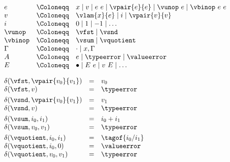 \begin{flushleft}

$\begin{array}{l c l}
  e & \Coloneqq & x \mid v \mid e~e \mid \vpair{e}{e} \mid \vunop~e \mid \vbinop~e~e
\\
  v & \Coloneqq & \vlam{x}{e} \mid i \mid \vpair{v}{v}
\\
  i & \Coloneqq & 0 \mid 1 \mid -1 \mid \ldots
\\
  \vunop & \Coloneqq & \vfst \mid \vsnd
\\
  \vbinop & \Coloneqq & \vsum \mid \vquotient
\\
  \Gamma & \Coloneqq & \cdot \mid x,\Gamma
\\
  A & \Coloneqq & e \mid \typeerror \mid \valueerror
\\
  E & \Coloneqq & \bullet \mid E~e \mid v~E \mid \ldots
\end{array}$

\medskip
{}
\begin{mathpar}







\end{mathpar}

\medskip

$\begin{array}{l c l}
  \delta(\vfst, \vpair{v_0}{v_1}) & = & v_0
\\
  \delta(\vfst, v) & = & \typeerror
\\[0.8ex]
  \delta(\vsnd, \vpair{v_0}{v_1}) & = & v_1
\\
  \delta(\vsnd, v) & = & \typeerror
\\[0.8ex]
  \delta(\vsum, i_0, i_1) & = & i_0 + i_1
\\
  \delta(\vsum, v_0, v_1) & = & \typeerror
\\[0.8ex]
  \delta(\vquotient, i_0, i_1) & = & \tagof{i_0 / i_1}
\\
  \delta(\vquotient, i_0, 0) & = & \valueerror
\\
  \delta(\vquotient, v_0, v_1) & = & \typeerror
\end{array}$


\end{flushleft}
